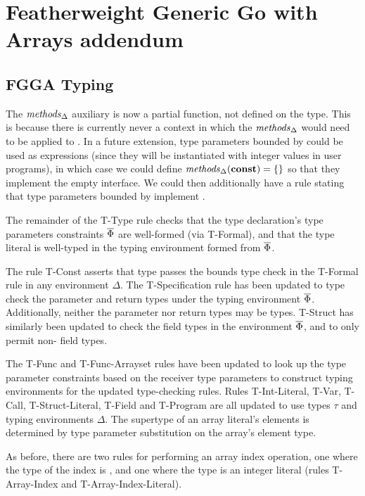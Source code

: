 \section{Featherweight Generic Go with Arrays addendum}

\subsection{FGGA Typing}
\label{sec:fgg-appx-typing}

The $\mathit{methods}_\Delta$ auxiliary is now a partial function, not defined on the
 type. This is because there is currently never a context in which the
$\mathit{methods}_\Delta$ would need to be applied to . In a future extension,
type parameters bounded by  could be used as expressions (since they will
be instantiated with integer values in user programs), in which case we could
define $\mathit{methods}_\Delta(\texttt{\bf const}) = \{\}$ so that they implement the empty
interface. We could then additionally have a rule stating that type parameters
bounded by  implement .

The remainder of the T-Type rule checks that the type declaration's type
parameters constraints $\overline{\Phi}$ are well-formed (via T-Formal), and that the
type literal is well-typed in the typing environment formed from $\overline{\Phi}$.

The rule T-Const asserts that  type passes the bounds type check in
the T-Formal rule in any environment $\Delta$. The T-Specification rule has been
updated to type check the parameter and return types under the typing
environment $\overline{\Phi}$. Additionally, neither the parameter nor return types
may be  types. T-Struct has similarly been updated to check the field
types in the environment $\overline{\Phi}$, and to only permit non- field
types.

The T-Func and T-Func-Arrayset rules have been updated to look up the type
parameter constraints based on the receiver type parameters to construct typing
environments for the updated type-checking rules. Rules T-Int-Literal, T-Var,
T-Call, T-Struct-Literal, T-Field and T-Program are all updated to use types
$\tau$ and typing environments $\Delta$. The supertype of an array literal's
elements is determined by type parameter substitution on the array's element
type.

As before, there are two rules for performing an array index operation, one
where the type of the index is , and one where the type is an integer
literal (rules T-Array-Index and T-Array-Index-Literal).
